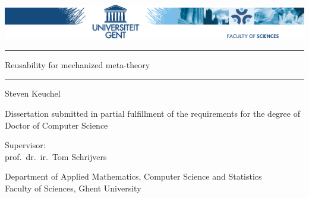 \begin{titlepage}
\centering
\includegraphics[width=\textwidth]{figs/WE.eps}

\vspace{1cm}


\vspace{2.25cm}

\hrule
\vspace{0.5cm}
{\Huge \textsf{Reusability for mechanized meta-theory}}
%
\vspace{0.5cm}
\hrule

\vspace{2.25cm}

{\LARGE \textsf{Steven Keuchel}}

\vspace{2.25cm}

{\textsf{Dissertation submitted in partial fulfillment of the requirements for the degree of Doctor of Computer Science}}

\vfill

{\textsf{Supervisor: \\
prof.~dr.~ir.~Tom Schrijvers}}



\vfill

{\textsf{Department of Applied Mathematics, Computer Science and Statistics\\
Faculty of Sciences, Ghent University}}
\end{titlepage}

